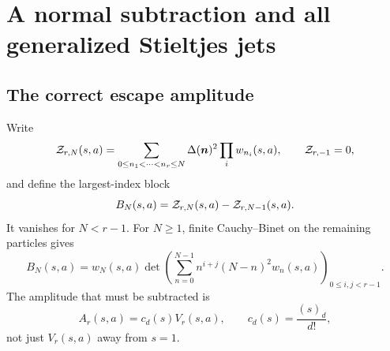\section{A normal subtraction and all generalized Stieltjes jets}
\label{sec:stieltjes}

\subsection{The correct escape amplitude}
Write
\[
 \mathcal Z_{r,N}(s,a)=\sum_{0\le n_1<\cdots<n_r\le N}
       \Delta(\bm n)^2\prod_iw_{n_i}(s,a),\qquad \mathcal Z_{r,-1}=0,
\]
and define the largest-index block
\begin{equation}\label{eq:block}
 B_N(s,a)=\mathcal Z_{r,N}(s,a)-\mathcal Z_{r,N-1}(s,a).
\end{equation}
It vanishes for $N<r-1$. For $N\ge1$, finite Cauchy--Binet on the
remaining particles gives
\begin{equation}\label{eq:block-det}
 B_N(s,a)=w_N(s,a)
 \det\left(\sum_{n=0}^{N-1}n^{i+j}(N-n)^2w_n(s,a)\right)_{0\le i,j<r-1}.
\end{equation}
The amplitude that must be subtracted is
\begin{equation}\label{eq:amplitude}
 A_r(s,a)=c_d(s)V_r(s,a),\qquad c_d(s)=\frac{(s)_d}{d!},
\end{equation}
not just $V_r(s,a)$ away from $s=1$.

